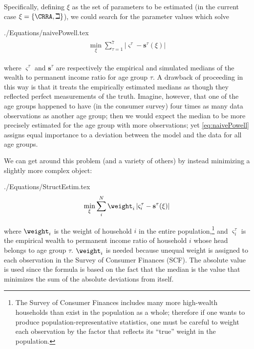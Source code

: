 \documentclass[titlepage, headings=optiontotocandhead]{\econtex}
\begin{document}
Specifically, defining $\xi$ as the set of parameters
to be estimated (in the current case $\xi =\{\CRRA ,{\beth}\}$), we could search for
the parameter values which solve
\begin{verbatimwrite}{./Equations/naivePowell.tex}
  \begin{equation}
    \begin{gathered}
      \begin{aligned}
        \min_{\xi} \sum_{\tau=1}^{7} |\varsigma^{\tau} -\mathbf{s}^{\tau}(\xi)|  \label{eq:naivePowell}
      \end{aligned}
    \end{gathered}
  \end{equation}
\end{verbatimwrite}
\unskip
where $\varsigma^{\tau }$ and $\mathbf{s}^{\tau}$ are respectively the empirical
and simulated medians of the wealth to permanent income ratio for age group $\tau$.
A drawback of proceeding in this way is that it treats the empirically
estimated medians as though they reflected perfect measurements of the
truth. Imagine, however, that one of the age groups happened to have
(in the consumer survey) four times as many data observations as
another age group; then we would expect the median to be more
precisely estimated for the age group with more observations; yet
\eqref{eq:naivePowell} assigns equal importance to a deviation between
the model and the data for all age groups.

We can get around this problem (and a variety of others) by instead minimizing a slightly more complex object:
\begin{verbatimwrite}{./Equations/StructEstim.tex}
  \begin{equation}
    \min_{\xi}\sum\limits_{i}^{N}\weight _{i}\left|\varsigma_{i}^{\tau }-\mathbf{s}^{\tau}(\xi )\right|\label{eq:StructEstim}
  \end{equation}
\end{verbatimwrite}
\unskip
where $\weight_{i}$ is the weight of household $i$ in the entire
population,\footnote{The Survey of Consumer Finances includes many
  more high-wealth households than exist in the population as a whole;
  therefore if one wants to produce population-representative
  statistics, one must be careful to weight each observation by the
  factor that reflects its ``true'' weight in the population.} and
$\varsigma_{i}^{\tau }$ is the empirical wealth to permanent income
ratio of household $i$ whose head belongs to age group
$\tau$. $\weight _{i}$ is needed because unequal weight is assigned to
each observation in the Survey of Consumer Finances (SCF). The
absolute value is used since the formula is based on the fact that the
median is the value that minimizes the sum of the absolute deviations
from itself.
\end{document}
